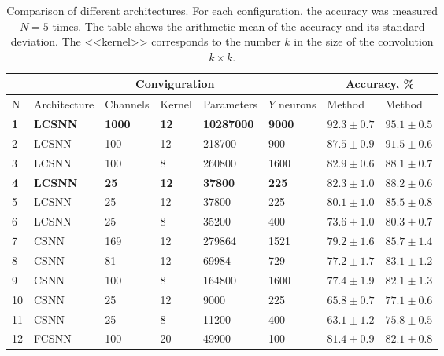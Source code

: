 \documentclass[a4paper]{article}
\begin{document}
\begin{table}
 \caption{Comparison of different architectures. For each configuration, the accuracy was measured $ N = 5 $ times. The table shows the arithmetic mean of the accuracy and its standard deviation. The <<kernel>> corresponds to the number $ k $ in the size of the convolution $ k \times k $.}
\begin{center}
\begin{adjustwidth}{-1cm}{}
\begin{tabular}{|l|l|l|l|l|l|p{2.2cm}|p{2.2cm}|}
\hline
&\multicolumn{5}{c|}{Conviguration} & \multicolumn{2}{c|}{Accuracy, \%}\\
\hline
N & Architecture & Channels & Kernel & Parameters & $Y$ neurons & {Method \footnotemark[1]} & {Method \footnotemark[2]} \\
\hline\hline
{\textbf{1}} & {\textbf{LCSNN}} & {\textbf{1000}} & {\textbf{12}} & {\textbf{10287000}} & {\textbf{9000}} & {$\mathbf{92.3 \pm 0.7}$} & {$\mathbf{95.1 \pm 0.5}$}\\
\hline
2 & {LCSNN} & {100} & {12} & {218700} & {900} & {$87.5 \pm 0.9$} & {$91.5 \pm 0.6$}\\
\hline
3 & {LCSNN} & {100} & {8} & {260800} & {1600} & {$82.9 \pm 0.6$} & {$88.1 \pm 0.7$}\\
\hline
{\textbf{4}} & {\textbf{LCSNN\footnotemark[3]}} & {\textbf{25}} & {\textbf{12}} & {\textbf{37800}} & {\textbf{225}} & {$\mathbf{82.3 \pm 1.0}$} & {$\mathbf{88.2 \pm 0.6}$}\\
\hline
5 & {LCSNN} & {25} & {12} & {37800} & {225} & {$80.1 \pm 1.0$} & {$85.5 \pm 0.8$}\\
\hline
6 & {LCSNN} & {25} & {8} & {35200} & {400} & {$73.6 \pm 1.0$} & {$80.3 \pm 0.7$}\\
\hline\hline
7 & {CSNN} & {169} & {12} & {279864} & {1521} & {$79.2 \pm 1.6$} & {$85.7 \pm 1.4$}\\
\hline
8 & {CSNN} & {81} & {12} & {69984} & {729} & {$77.2 \pm 1.7$} & {$83.1 \pm 1.2$}\\
\hline
9 & {CSNN} & {100} & {8} & {164800} & {1600} & {$77.4 \pm 1.9$} & {$82.1 \pm 1.3$}\\
\hline
10 & {CSNN} & {25} & {12} & {9000} & {225} & {$65.8 \pm 0.7$} & {$77.1 \pm 0.6$}\\
\hline
11 & {CSNN} & {25} & {8} & {11200} & {400} & {$63.1 \pm 1.2$} & {$75.8 \pm 0.5$}\\
\hline\hline
12 & {FCSNN} & {100} & {20} & {49900} & {100} & {$81.4 \pm 0.9$} & {$82.1 \pm 0.8$}\\
\hline
\end{tabular}
\end{adjustwidth}
\end{center}
 \label{results}
\end{table}
\end{document}
